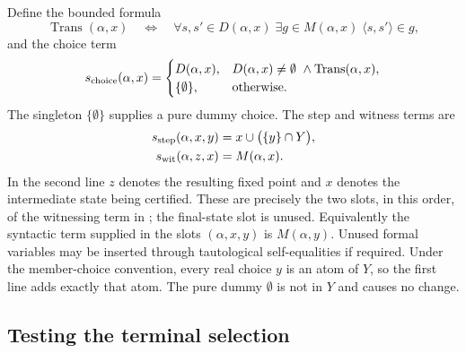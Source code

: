 Define the bounded formula
\[
 \operatorname{Trans}(\alpha,x)
 \quad\Longleftrightarrow\quad
 \forall s,s'\in D(\alpha,x)\;
   \exists g\in M(\alpha,x)\;
                    \langle s,s'\rangle\in g,
\]
and the choice term
\begin{equation}
 s_{\rm choice}(\alpha,x)=
 \begin{cases}
 D(\alpha,x),&
   D(\alpha,x)\ne\emptyset\ \land\operatorname{Trans}(\alpha,x),\\
 \{\emptyset\},&\text{otherwise}.
 \end{cases}
 \label{sen:guarded-choice}
\end{equation}
The singleton \(\{\emptyset\}\) supplies a pure dummy choice. The step and
witness terms are
\begin{equation}
 \begin{split}
 s_{\rm step}(\alpha,x,y)
      &=x\cup\bigl(\{y\}\cap Y\bigr),\\
 s_{\rm wit}(\alpha,z,x)&=M(\alpha,x).
 \end{split}
 \label{sen:step-witness}
\end{equation}
In the second line \(z\) denotes the resulting fixed point and \(x\)
denotes the intermediate state being certified. These are precisely
the two slots, in this order, of the witnessing term in
\cite[Section~3.1]{ls2023}; the final-state slot is unused.
Equivalently the syntactic term supplied in the slots \((\alpha,x,y)\)
is \(M(\alpha,y)\). Unused formal variables may be inserted through
tautological self-equalities if required. Under the member-choice
convention, every real choice \(y\) is an atom of \(Y\), so the first
line adds exactly that atom. The pure dummy \(\emptyset\) is not in
\(Y\) and causes no change.

\subsection{Testing the terminal selection}

